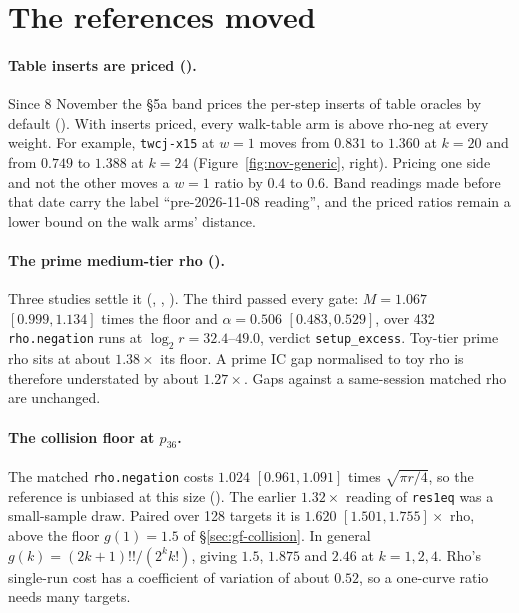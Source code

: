 \section{The references moved}\label{sec:nov-reference}

\paragraph{Table inserts are priced ().} Since 8 November
the \S5a band prices the per-step inserts of table oracles by default
(). With inserts
priced, every walk-table arm is above rho-neg at every weight. For example,
\texttt{twcj-x15} at $w=1$ moves from $0.831$ to $1.360$ at $k=20$ and from
$0.749$ to $1.388$ at $k=24$ (Figure~\ref{fig:nov-generic}, right). Pricing
one side and not the other moves a $w=1$ ratio by $0.4$ to $0.6$. Band
readings made before that date carry the label ``pre-2026-11-08 reading'',
and the priced ratios remain a lower bound on the walk arms' distance.

\paragraph{The prime medium-tier rho ().} Three studies settle
it (,
,
). The third passed every gate:
$M=1.067$ $[0.999,1.134]$ times the floor and $\alpha=0.506$
$[0.483,0.529]$, over 432 \texttt{rho.negation} runs at
$\log_2 r=32.4$--$49.0$, verdict \texttt{setup\_excess}. Toy-tier prime rho
sits at about $1.38\times$ its floor. A prime IC gap normalised to toy rho
is therefore understated by about $1.27\times$. Gaps against a same-session
matched rho are unchanged.

\paragraph{The collision floor at $p_{36}$.} The matched \texttt{rho.negation}
costs $1.024$ $[0.961,1.091]$ times $\sqrt{\pi r/4}$, so the reference is
unbiased at this size ().
The earlier $1.32\times$ reading of \texttt{res1eq} was a small-sample draw.
Paired over 128 targets it is $1.620$ $[1.501,1.755]\times$ rho, above the
floor $g(1)=1.5$ of \S\ref{sec:gf-collision}. In general
$g(k)=(2k+1)!!/(2^kk!)$, giving $1.5$, $1.875$ and $2.46$ at $k=1,2,4$.
Rho's single-run cost has a coefficient of variation of about $0.52$, so a
one-curve ratio needs many targets.

